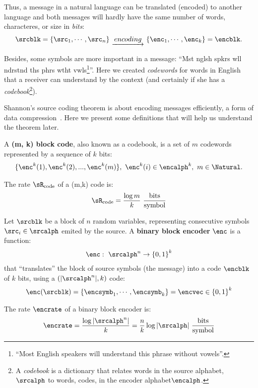 Thus, a message in a natural language can be translated (encoded) to another language and both messages will hardly have the same number of words, characteres, or size in \emph{bits}:
\begin{align}
	\srcblk=\{\src_1, \cdots, \src_n\}&~\underrightarrow{~encoding~}~
	\{\enc_1,  \cdots, \enc_k\}=\encblk.\\
\end{align}

Besides, some symbols are more important in a message: ``Mst nglsh spkrs wll ndrstnd ths phrs wtht vwls\footnote{``Most English speakers will understand this phrase without vowels''.}''. Here we created \emph{codewords} for words in English that a receiver can understand by the context (and certainly if she has a \emph{codebook}\footnote{A \emph{codebook} is a dictionary that relates words in the source alphabet, \(\srcalph\) to words, codes, in the encoder alphabet\(\encalph\).}).

Shannon's source coding theorem is about encoding messages efficiently, a form of data compression~\cite{stone:2015}. Here we present some definitions that will help us understand the theorem later.

\begin{definition}
A \textbf{(m, k) block code}, also known as a codebook, is a set of \(m\) codewords represented by a sequence of \(k\) bits:
\begin{align}
\{\enc^k(1),\enc^k(2),...,\enc^k(m)\},~\enc^k(i) \in \encalph^k, ~m \in \Natural.
\end{align}
\end{definition}
\begin{definition} The rate \(\sR_{\text{code}}\) of a (m,k) code is:
	\begin{align}
		\sR_{\text{code}} = \frac{\log m}{k}~\frac{\text{bits}}{\text{symbol}}\label{code_rate}
		\end{align}
\end{definition}
\begin{definition}
Let \(\srcblk\) be a block of \(n\) random variables, representing consecutive symbols \(\src_i \in \srcalph\) emited by the source. A \textbf{binary block encoder}  \(\enc\) is a function:
\begin{align}
	\enc:~ \srcalph^n \to {\{0,1\}}^k
\end{align}
that ``translates'' the block of source symbols (the message) into a code \(\encblk\) of \(k\) bits, using a \((|\srcalph^n|, k)\) code:
\begin{align}
	\enc(\srcblk)=\{\encsymb_1,  \cdots, \encsymb_k\}=\encvec \in {\{0,1\}}^k
\end{align}
\end{definition}
\begin{definition} The rate \(\encrate\) of a binary block encoder is:
	\begin{align}
		\encrate = \frac{\log |\srcalph^n|}{k}=\frac{n}{k}\log |\srcalph|~\frac{\text{bits}}{\text{symbol}}
		\end{align}
\end{definition}

